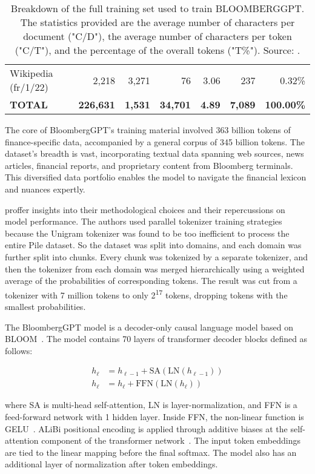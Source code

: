 \begin{table}[!h]
\begin{tabularx}{\textwidth}{lrrrrrr}
		Wikipedia (fr/1/22) & 2,218            & 3,271          & 76              & 3.06          & 237            & 0.32\%            \\
		\textbf{TOTAL}      & \textbf{226,631} & \textbf{1,531} & \textbf{34,701} & \textbf{4.89} & \textbf{7,089} & \textbf{100.00\%} \\
		\bottomrule
	\end{tabularx}
	\caption{Breakdown of the full training set used to train BLOOMBERGGPT. The statistics provided are the average number of characters per document ("C/D"), the average number of characters per token ("C/T"), and the percentage of the overall tokens ("T\%"). Source: \protect\textcite{wu2023bloomberggpt}.}
	\label{tab:training_set}
\end{table}

The core of BloombergGPT's training material involved 363 billion tokens of finance-specific data, accompanied by a general corpus of 345 billion tokens.
The dataset's breadth is vast, incorporating textual data spanning web sources, news articles, financial reports, and proprietary content from Bloomberg terminals.
This diversified data portfolio enables the model to navigate the financial lexicon and nuances expertly.

\textcite{wu2023bloomberggpt} proffer insights into their methodological choices and their repercussions on model performance.
The authors used parallel tokenizer training strategies because the Unigram tokenizer was found to be too inefficient to process the entire Pile dataset.
So the dataset was split into domains, and each domain was further split into chunks.
Every chunk was tokenized by a separate tokenizer, and then the tokenizer from each domain was merged hierarchically using a weighted average of the probabilities of corresponding tokens.
The result was cut from a tokenizer with 7 million tokens to only 2\textsuperscript{17} tokens, dropping tokens with the smallest probabilities.

The BloombergGPT model is a decoder-only causal language model based on BLOOM~\cite{workshop2023bloom}.
The model contains 70 layers of transformer decoder blocks defined as follows:

\begin{align*}
	h_{\ell} & = h_{\ell-1} + \text{SA}(\text{LN}(h_{\ell-1})) \\
	h_{\ell} & = h_{\ell} + \text{FFN}(\text{LN}(h_{\ell}))
\end{align*}

where SA is multi-head self-attention, LN is layer-normalization, and FFN is a feed-forward network with 1 hidden layer.
Inside FFN, the non-linear function is GELU~\cite{hendrycks2016gelu}.
ALiBi positional encoding is applied through additive biases at the self-attention component of the transformer network~\cite{lescao2022milliongpuhours}. The input token embeddings are tied to the linear mapping before the final softmax.
The model also has an additional layer of normalization after token embeddings.

